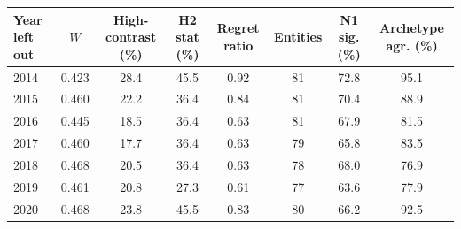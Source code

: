 \begin{tabular}{lccccccc}
\toprule
Year left out & $W$ & High-contrast (\%) & H2 stat (\%) & Regret ratio & Entities & N1 sig. (\%) & Archetype agr. (\%) \\
\midrule
2014 & 0.423 & 28.4 & 45.5 & 0.92 & 81 & 72.8 & 95.1 \\
2015 & 0.460 & 22.2 & 36.4 & 0.84 & 81 & 70.4 & 88.9 \\
2016 & 0.445 & 18.5 & 36.4 & 0.63 & 81 & 67.9 & 81.5 \\
2017 & 0.460 & 17.7 & 36.4 & 0.63 & 79 & 65.8 & 83.5 \\
2018 & 0.468 & 20.5 & 36.4 & 0.63 & 78 & 68.0 & 76.9 \\
2019 & 0.461 & 20.8 & 27.3 & 0.61 & 77 & 63.6 & 77.9 \\
2020 & 0.468 & 23.8 & 45.5 & 0.83 & 80 & 66.2 & 92.5 \\
\bottomrule
\end{tabular}
